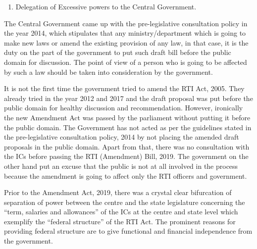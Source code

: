 \begin{multicols}{2}
\begin{enumerate}
\item Delegation of Excessive powers to the Central Government. 
\end{enumerate}

\vspace{-.3cm}


\noi
The Central Government came up with the pre-legislative consultation policy in the year
2014, which stipulates that any ministry/department which is going to make new laws or
amend the existing provision of any law, in that case, it is the duty on the part of the
government to put such draft bill before the public domain for discussion. The point of view
of a person who is going to be affected by such a law should be taken into consideration by
the government.

\noi
It is not the first time the government tried to amend the RTI Act, 2005. They already tried in
the year 2012 and 2017 and the draft proposal was put before the public domain for healthy
discussion and recommendation. However, ironically the new Amendment Act was passed by
the parliament without putting it before the public domain. The Government has not acted as
per the guidelines stated in the pre-legislative consultation policy, 2014 by not placing the
amended draft proposals in the public domain. Apart from that, there was no consultation
with the ICs before passing the RTI (Amendment) Bill, 2019. The government on the other
hand put an excuse that the public is not at all involved in the process because the amendment
is going to affect only the RTI officers and government.


\noi
Prior to the Amendment Act, 2019, there was a crystal clear bifurcation of separation of
power between the centre and the state legislature concerning the “term, salaries and
allowances” of the ICs at the centre and state level which exemplify the “federal structure” of
the RTI Act. The prominent reasons for providing federal structure are to give functional and
financial independence from the government.


\end{multicols}
